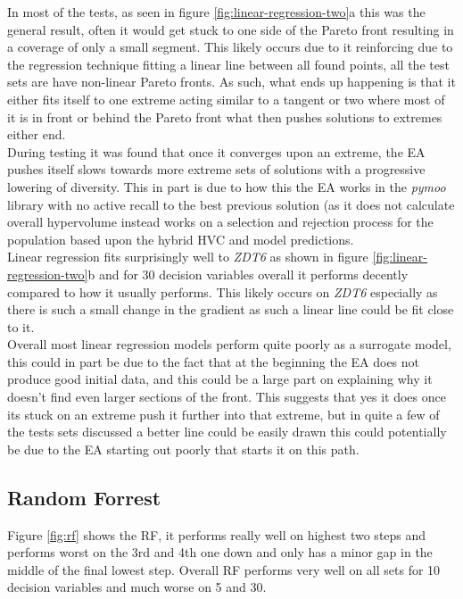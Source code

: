 \documentclass[sigconf,review,nonacm]{acmart}
\begin{document}
\noindent In most of the tests, as seen in figure \ref{fig:linear-regression-two}a this was the general result, often it would get stuck to one side of the Pareto front resulting in a coverage of only a small segment. This likely occurs due to it reinforcing due to the regression technique fitting a linear line between all found points, all the test sets are have non-linear Pareto fronts. As such, what ends up happening is that it either fits itself to one extreme acting similar to a tangent or two where most of it is in front or behind the Pareto front what then pushes solutions to extremes either end. \\

\noindent During testing it was found that once it converges upon an extreme, the EA pushes itself slows towards more extreme sets of solutions with a progressive lowering of diversity. This in part is due to how this the EA works in the \textit{pymoo} library with no active recall to the best previous solution (as it does not calculate overall hypervolume instead works on a selection and rejection process for the population based upon the hybrid HVC and model predictions. \\

\noindent Linear regression fits surprisingly well to \textit{ZDT6} as shown in figure \ref{fig:linear-regression-two}b and for 30 decision variables overall it performs decently compared to how it usually performs. This likely occurs on \textit{ZDT6} especially as there is such a small change in the gradient as such a linear line could be fit close to it. \\

\noindent Overall most linear regression models perform quite poorly as a surrogate model, this could in part be due to the fact that at the beginning the EA does not produce good initial data, and this could be a large part on explaining why it doesn't find even larger sections of the front. This suggests that yes it does once its stuck on an extreme push it further into that extreme, but in quite a few of the tests sets discussed a better line could be easily drawn this could potentially be due to the EA starting out poorly that starts it on this path. 

\subsection{Random Forrest}


Figure \ref{fig:rf} shows the RF, it performs really well on highest two steps and performs worst on the 3rd and 4th one down and only has a minor gap in the middle of the final lowest step. Overall RF performs very well on all sets for 10 decision variables and much worse on 5 and 30. 
\end{document}

